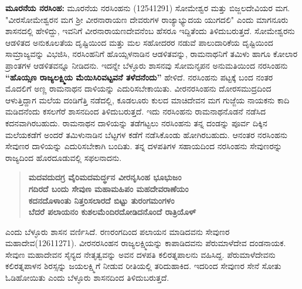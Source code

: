\textbf{ಮೂರನೆಯ ನರಸಿಂಹ: } ಮೂರನೆಯ ನರಸಿಂಹನು (1254\enginline{-}1291) ಸೋಮೇಶ್ವರ ಮತ್ತು ಬಿಜ್ಜಲದೇವಿಯರ ಮಗ. "ವೀರಸೋಮೇಶ್ವರನ ಮಗ ಶ‍್ರೀ ವೀರನಾರಾಯಣ ದೇವರುಗಳ ರಾಜ್ಯಾಭ್ಯುದಯ ಯುಗದಲಿ" ಎಂದು ಮಾಗನೂರು ಶಾಸನದಲ್ಲಿ ಹೇಳಿದ್ದು, ಇವನಿಗೆ ವೀರನಾರಾಯಣದೇವನೆಂಬ ಹೆಸರೂ ಇದ್ದಿತೆಂದು ತಿಳಿದುಬರುತ್ತದೆ. ಸೋಮೇಶ್ವರನು ಆಡಳಿತದ ಅನುಕೂಲತೆಯ ದೃಷ್ಟಿಯಿಂದ ಮತ್ತು ಮಲ ಸಹೋದರರ ನಡುವೆ ಪಾಲುದಾರಿಕೆಯ ದೃಷ್ಟಿಯಿಂದ ಸಾಮ್ರಾಜ್ಯವನ್ನು ವಿಭಜಿಸಿ, ನರಸಿಂಹನಿಗೆ ಹೊಯ್ಸಳನಾಡಿನ ಆಡಳಿತವನ್ನು, ರಾಮನಾಥನಿಗೆ ತಮಿಳು ಹಾಗೂ ಕೋಲಾರ ಪ್ರಾಂತಗಳ ಆಡಳಿತವನ್ನೂ ನೀಡಿದನು. ಇದನ್ನೇ ಬೆಳ್ಳೂರು ಶಾಸನವು ಸೋಮನೃಪನ ಅನುಮತಿಯಿಂದ ನರಸಿಂಹನು \textbf{“ಹೊಯ್ಸಣ ರಾಜ್ಯಲಕ್ಷ್ಮಿಯ ಮೆಯಿಸಿರಿವಟ್ಟವನೆ ತಳೆದನೆಂದು”} ಹೇಳಿದೆ. ನರಸಿಂಹನು ಪಟ್ಟಕ್ಕೆ ಬಂದ ನಂತರ ಮೊದಲಿಗೆ ಅಣ್ಣ ರಾಮನಾಥನ ದಾಳಿಯನ್ನು ಎದುರಿಸಬೇಕಾಯಿತು. ವೀರನರಸಿಂಹನು ದೋರಸಮುದ್ರದಿಂದ ಆಳುತ್ತಿದ್ದಾಗ ಮಲೆಯ ದಂಡಿಗೆತ್ತಿ ನಡೆದಲ್ಲಿ, ಕೂಡಲೂರು ಕುಲದ ಮಾಚಿದೇವನ ಮಗ ಗುಜ್ಜೆಯ ನಾಯಕನು ಕಾದಿ ಮಡಿದನೆಂದು ಕಸಲಗೆರೆ ಶಾಸನದಿಂದ ತಿಳಿದುಬರುತ್ತದೆ. ಇದು ನರಸಿಂಹನು ರಾಮನಾಥನೊಡನೆ ನಡೆಸಿದ ಕದನವಾಗಿರಬಹುದು. ರಾಮನಾಥನ ದಾಳಿಯನ್ನು ತಡೆಗಟ್ಟಲು ನರಸಿಂಹನು ತನ್ನ ದಂಡನ್ನು ಪೂರ್ವ ದಿಕ್ಕಿನ ಮಲೆಯಕಡೆಗೆ ಅಂದರೆ ತಮಿಳುನಾಡಿನ ಬೆಟ್ಟಗಳ ಕಡೆಗೆ ನಡೆಸಿಕೊಂಡು ಹೋಗಿರಬಹುದು. ಆನಂತರ ನರಸಿಂಹನು ಸೇವುಣರ ದಾಳಿಯನ್ನು ಎದುರಿಸಬೇಕಾಗಿ ಬಂದಿತು. ತನ್ನ ದಳಪತಿಗಳ ಸಹಾಯದಿಂದ ನರಸಿಂಹನು ಸೇವುಣರನ್ನು ರಾಜ್ಯದಿಂದ ಹೊರದೂಡುವಲ್ಲಿ ಸಫಲನಾದನು.

\begin{verse}
\textbf{ಮದವದುದಗ್ರ ವೈರಿಮದಮರ್ದ್ಧನ ವೀರನೃಸಿಂಹ ಭೂಭುಜಂ} \\\textbf{ಗದಿರದೆ ಬಂದು ಸೇವುಣ ಮಹಾಮಹಿಪಂ ಮಹದೇವರಾಣೆಯಂ} \\\textbf{ಕದನದೊಳಾಂತು ನಿತ್ತರಿಸಲಾರದೆ ಬಿಟ್ಟು ತುರಂಗಮಂಗಳಂ} \\\textbf{ಬೆದರೆ ಪಲಾಯನಂ ಕುಶಲಮೆಂದಿರದೋಡಿದನೊಂದೆ ರಾತ್ರಿಯೊಳ್​}
\end{verse}

ಎಂದು ಬೆಳ್ಳೂರು ಶಾಸನ ವರ್ಣಿಸಿದೆ. ರಣರಂಗದಿಂದ ಪಲಾಯನ ಮಾಡಿದವನು ಸೇವುಣರ ಮಹಾದೇವ(1261\enginline{-}1271). ವೀರನರಸಿಂಹನ ರಾಜ್ಯಲಕ್ಷ್ಮಿಯನ್ನು ಕಾಪಾಡಿದವನು ಪೆರುಮಾಳೆದೇವ ದಂಡನಾಯಕ. ಸೇವುಣ ಮಹಾದೇವನ ಸೈನ್ಯದ ನೇತೃತ್ವವನ್ನು ಅವನ ದಳಪತಿ ಕಲಿರತ್ನಪಾಲನು ವಹಿಸಿದ್ದ. ಪೆರುಮಾಳೆದೇವನು ಕಲಿರತ್ನಪಾಳನ ಶಿರಸ್ಸನ್ನು ಜಯಲಕ್ಷ್ಮಿಗೆ ನೀಡುವ ರೀತಿಯಲ್ಲಿ ತರಿದುಹಾಕಿದ. ಇದರಿಂದ ಸೇವುಣರ ಸೇನೆ ಸೋತು ಓಡಿಹೋಯಿತು ಎಂದು ಬೆಳ್ಳೂರು ಶಾಸನದಿಂದ ತಿಳಿದುಬರುತ್ತದೆ.

